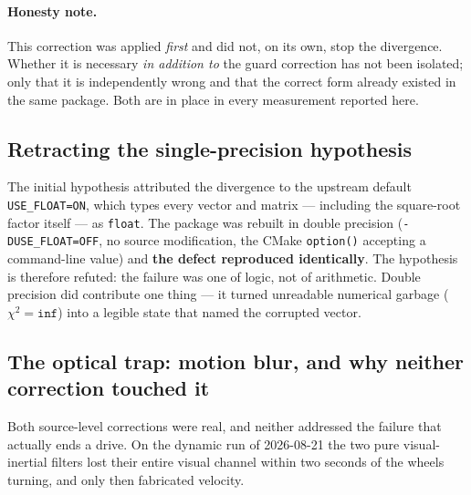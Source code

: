 \paragraph{Honesty note.} This correction was applied \emph{first} and did not,
on its own, stop the divergence. Whether it is necessary \emph{in addition to}
the guard correction has not been isolated; only that it is independently wrong
and that the correct form already existed in the same package. Both are in
place in every measurement reported here.

\subsection{Retracting the single-precision hypothesis}
\label{ssec:retract}

The initial hypothesis attributed the divergence to the upstream default
\texttt{USE\_FLOAT=ON}, which types every vector and matrix --- including the
square-root factor itself --- as \texttt{float}. The package was rebuilt in
double precision (\texttt{-DUSE\_FLOAT=OFF}, no source modification, the CMake
\texttt{option()} accepting a command-line value) and \textbf{the defect
reproduced identically}. The hypothesis is therefore refuted: the failure was
one of logic, not of arithmetic. Double precision did contribute one thing ---
it turned unreadable numerical garbage ($\chi^{2}=\texttt{inf}$) into a legible
state that named the corrupted vector.

\subsection{The optical trap: motion blur, and why neither correction touched it}
\label{ssec:flou}

Both source-level corrections were real, and neither addressed the failure that
actually ends a drive. On the dynamic run of 2026-08-21 the two pure
visual-inertial filters lost their entire visual channel within two seconds of
the wheels turning, and only then fabricated velocity.

